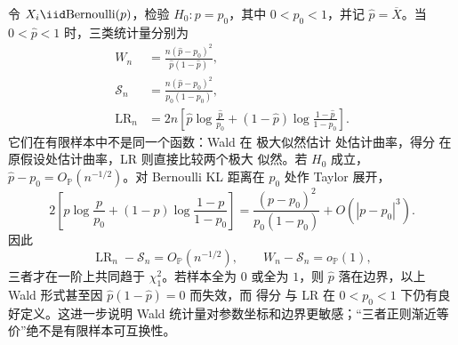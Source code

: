 \begin{exbox}
令 $X_i\iid\mathrm{Bernoulli}(p)$，检验 $H_0:p=p_0$，其中 $0<p_0<1$，并记 $\widehat p=\overline X$。当 $0<\widehat p<1$ 时，三类统计量分别为
\begin{align*}
 W_n
 &=\frac{n(\widehat p-p_0)^2}
 {\widehat p(1-\widehat p)},\\
 \mathcal S_n
 &=\frac{n(\widehat p-p_0)^2}
 {p_0(1-p_0)},\\
 \operatorname{LR}_n
 &=2n\left[
 \widehat p\log\frac{\widehat p}{p_0}
 +(1-\widehat p)\log\frac{1-\widehat p}{1-p_0}
 \right].
\end{align*}
它们在有限样本中不是同一个函数：Wald 在 极大似然估计 处估计曲率，得分 在原假设处估计曲率，LR 则直接比较两个极大 似然。若 $H_0$ 成立，$\widehat p-p_0=O_{\mathbb P}(n^{-1/2})$。对 Bernoulli KL 距离在 $p_0$ 处作 Taylor 展开，
\[
 2\left[
 p\log\frac p{p_0}
 +(1-p)\log\frac{1-p}{1-p_0}
 \right]
 =\frac{(p-p_0)^2}{p_0(1-p_0)}
 +O(|p-p_0|^3).
\]
因此
\[
 \operatorname{LR}_n-\mathcal S_n=O_{\mathbb P}(n^{-1/2}),
 \qquad
 W_n-\mathcal S_n=o_{\mathbb P}(1),
\]
三者才在一阶上共同趋于 $\chi^2_1$。若样本全为 $0$ 或全为 $1$，则 $\widehat p$ 落在边界，以上 Wald 形式甚至因 $\widehat p(1-\widehat p)=0$ 而失效，而 得分 与 LR 在 $0<p_0<1$ 下仍有良好定义。这进一步说明 Wald 统计量对参数坐标和边界更敏感；“三者正则渐近等价”绝不是有限样本可互换性。
\end{exbox}
